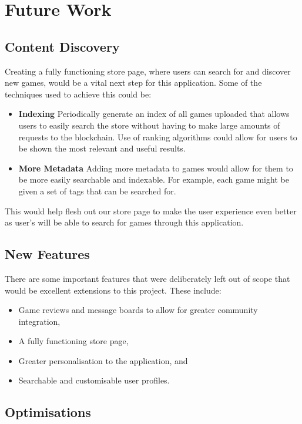 \section{Future Work}

\subsection*{Content Discovery}
Creating a fully functioning store page, where users can search for and discover new games, would be a vital next step for this application. Some of the techniques used to achieve this could be:

\begin{itemize}
  \item \textbf{Indexing} Periodically generate an index of all games uploaded that allows users to easily search the store without having to make large amounts of requests to the blockchain. Use of ranking algorithms could allow for users to be shown the most relevant and useful results.
  \item \textbf{More Metadata} Adding more metadata to games would allow for them to be more easily searchable and indexable. For example, each game might be given a set of tags that can be searched for.
\end{itemize}

\newparagraph
This would help flesh out our store page to make the user experience even better as user's will be able to search for games through this application.

\subsection*{New Features}

There are some important features that were deliberately left out of scope that would be excellent extensions to this project. These include:

\begin{itemize}
  \item Game reviews and message boards to allow for greater community integration,
  \item A fully functioning store page,
  \item Greater personalisation to the application, and
  \item Searchable and customisable user profiles.
\end{itemize}

\subsection*{Optimisations}

